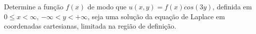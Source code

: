 \linespread{1.5}

Determine a função $f(x)$ de modo que $u(x,y) = f(x)cos(3y)$, definida em $0\leq x < \infty$, $-\infty<y<+\infty$, seja uma solução da equação de Laplace em coordenadas cartesianas, limitada na região de definição.